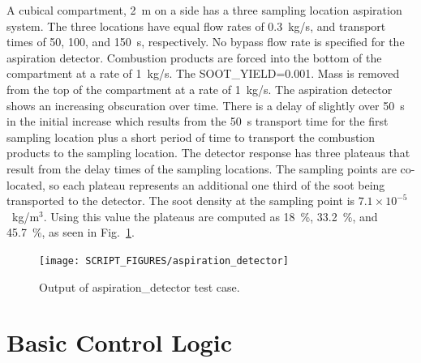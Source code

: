 \documentclass[11pt]{book}
\begin{document}
A cubical compartment, 2~m on a side has a three sampling location aspiration system.  The three locations have equal flow rates of 0.3~kg/s, and transport times of 50, 100, and 150~s, respectively.  No bypass flow rate is specified for the aspiration detector.  Combustion products are forced into the bottom of the compartment at a rate of 1~kg/s. The {\ct SOOT\_YIELD=0.001}. Mass is removed from the top of the compartment at a rate of 1~kg/s. The aspiration detector shows an increasing obscuration over time.  There is a delay of slightly over 50~s in the initial increase which results from the 50~s transport time for the first sampling location plus a short period of time to transport the combustion products to the sampling location.  The detector response has three plateaus that result from the delay times of the sampling locations.  The sampling points are co-located, so each plateau represents an additional one third of the soot being transported to the detector.  The soot density at the sampling point is $7.1 \times 10^{-5}$~kg/m$^3$.  Using this value the plateaus are computed as 18~\%, 33.2~\%, and 45.7~\%, as seen in Fig.~\ref{aspiration_detector_fig}.

\begin{figure}[ht]
\begin{center}
\texttt{[image: SCRIPT\_FIGURES/aspiration\_detector]}
\end{center}
\caption[Results of the {\ct aspiration\_detector} test case]{Output of {\ct aspiration\_detector} test case.}
\label{aspiration_detector_fig}
\end{figure}



\section{Basic Control Logic}
\label{info:basic_control}
\end{document}
